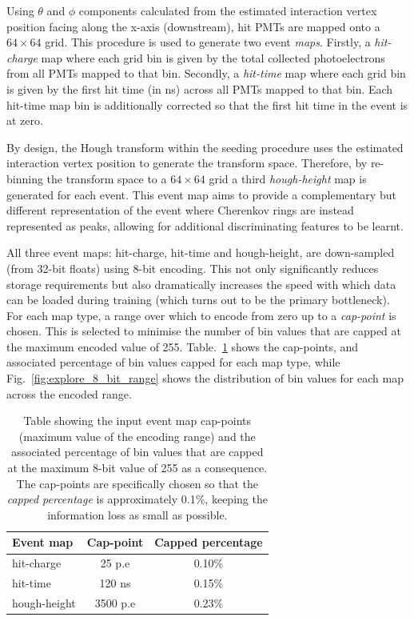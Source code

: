 Using $\theta$ and $\phi$ components calculated from the estimated interaction vertex position
facing along the x-axis (downstream), hit PMTs are mapped onto a $64 \times 64$ grid. This
procedure is used to generate two event \emph{maps}. Firstly, a \emph{hit-charge} map where each
grid bin is given by the total collected photoelectrons from all PMTs mapped to that bin.
Secondly, a \emph{hit-time} map where each grid bin is given by the first hit time (in ns) across
all PMTs mapped to that bin. Each hit-time map bin is additionally corrected so that the first hit
time in the event is at zero.

By design, the Hough transform within the seeding procedure uses the estimated interaction vertex
position to generate the transform space. Therefore, by re-binning the transform space to a $64
    \times 64$ grid a third \emph{hough-height} map is generated for each event. This event map aims
to provide a complementary but different representation of the event where Cherenkov rings are
instead represented as peaks, allowing for additional discriminating features to be learnt.

All three event maps: hit-charge, hit-time and hough-height, are down-sampled (from 32-bit floats)
using 8-bit encoding. This not only significantly reduces storage requirements but also
dramatically increases the speed with which data can be loaded during training (which turns out to
be the primary bottleneck). For each map type, a range over which to encode from zero up to a
\emph{cap-point} is chosen. This is selected to minimise the number of bin values that are capped
at the maximum encoded value of 255. Table.~\ref{tab:encoding} shows the cap-points, and
associated percentage of bin values capped for each map type, while
Fig.~\ref{fig:explore_8_bit_range} shows the distribution of bin values for each map across the
encoded range.

\begin{table}
    \begin{tabular}{lcc}
        Event map    & Cap-point & Capped percentage \\
        \midrule
        hit-charge   & 25 p.e    & 0.10\%            \\
        hit-time     & 120 ns    & 0.15\%            \\
        hough-height & 3500 p.e  & 0.23\%            \\
    \end{tabular}
    \caption[Table of input event map 8-bit cap-points]
    {Table showing the input event map cap-points (maximum value of the encoding range) and the
        associated percentage of bin values that are capped at the maximum 8-bit value of 255 as a
        consequence. The cap-points are specifically chosen so that the \emph{capped percentage}
        is approximately 0.1\%, keeping the information loss as small as possible.}
    \label{tab:encoding}
\end{table}

